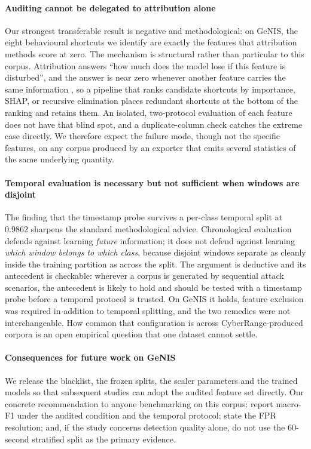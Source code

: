 \documentclass[review,12pt]{elsarticle}
\begin{document}
\paragraph{Auditing cannot be delegated to attribution alone}
Our strongest transferable result is negative and methodological: on GeNIS, the eight
behavioural shortcuts we identify are exactly the features that attribution methods score
at zero. The mechanism is structural rather than particular to this corpus. Attribution
answers ``how much does the model lose if this feature is disturbed'', and the answer is
near zero whenever another feature carries the same information
\cite{strobl2008conditional,hooker2021unrestricted}, so a pipeline that ranks candidate
shortcuts by importance, SHAP, or recursive elimination places redundant shortcuts at the
bottom of the ranking and retains them. An isolated, two-protocol evaluation of each
feature does not have that blind spot, and a duplicate-column check catches the extreme
case directly. We therefore expect the failure mode, though not the specific features, on
any corpus produced by an exporter that emits several statistics of the same underlying
quantity.

\paragraph{Temporal evaluation is necessary but not sufficient when windows are disjoint}
The finding that the timestamp probe survives a per-class temporal split at $0.9862$
sharpens the standard methodological advice. Chronological evaluation defends against
learning \emph{future} information; it does not defend against learning \emph{which
window belongs to which class}, because disjoint windows separate as cleanly inside the
training partition as across the split. The argument is deductive and its antecedent is
checkable: wherever a corpus is generated by sequential attack scenarios, the antecedent
is likely to hold and should be tested with a timestamp probe before a temporal protocol
is trusted. On GeNIS it holds, feature exclusion was required in addition to temporal
splitting, and the two remedies were not interchangeable. How common that configuration
is across CyberRange-produced corpora is an open empirical question that one dataset
cannot settle.

\paragraph{Consequences for future work on GeNIS}
We release the blacklist, the frozen splits, the scaler parameters and the trained models
so that subsequent studies can adopt the audited feature set directly. Our concrete
recommendation to anyone benchmarking on this corpus: report macro-F1 under the audited
condition and the temporal protocol; state the FPR resolution; and, if the study concerns
detection quality alone, do not use the 60-second stratified split as the primary
evidence.
\end{document}
